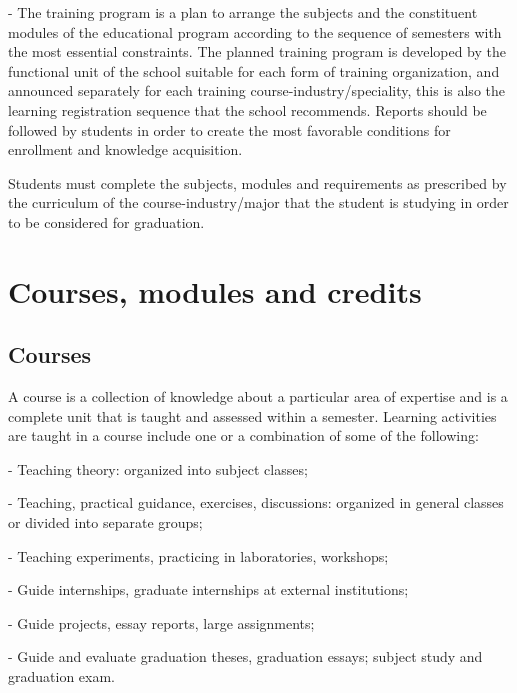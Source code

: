 - The training program is a plan to arrange the subjects and the constituent modules of the educational program according to the sequence of semesters with the most essential constraints. The planned training program is developed by the functional unit of the school suitable for each form of training organization, and announced separately for each training course-industry/speciality, this is also the learning registration sequence that the school recommends. Reports should be followed by students in order to create the most favorable conditions for enrollment and knowledge acquisition.

Students must complete the subjects, modules and requirements as prescribed by the curriculum of the course-industry/major that the student is studying in order to be considered for graduation.

\section{Courses, modules and credits}
\subsection{Courses}
A course is a collection of knowledge about a particular area of expertise and is a complete unit that is taught and assessed within a semester. Learning activities are taught in a course include one or a combination of some of the following:

- Teaching theory: organized into subject classes;

- Teaching, practical guidance, exercises, discussions: organized in general classes or divided into separate groups;

- Teaching experiments, practicing in laboratories, workshops;

- Guide internships, graduate internships at external institutions;

- Guide projects, essay reports, large assignments;

- Guide and evaluate graduation theses, graduation essays; subject study and graduation exam.



